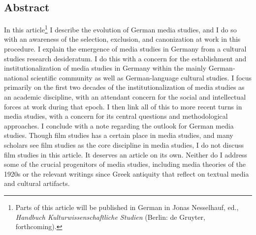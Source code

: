 \documentclass{tufte-handout}
\begin{document}
\begin{titlepage}
\vspace*{1em}


\hypertarget{abstract}{%
\section{\texorpdfstring{Abstract }{Abstract }}\label{abstract}}

In this article\footnote{Parts of this article will be published in
  German in Jonas Nesselhauf, ed., \emph{Handbuch
  Kulturwissenschaftliche Studien} (Berlin: de Gruyter, forthcoming).} I
describe the evolution of German media studies, and I do so with an
awareness of the selection, exclusion, and canonization at work in this
procedure. I explain the emergence of media studies in Germany from a
cultural studies research desideratum. I do this with a concern for the
establishment and institutionalization of media studies in Germany
within the mainly German-national scientific community as well as
German-language cultural studies. I focus primarily on the first two
decades of the institutionalization of media studies as an academic
discipline, with an attendant concern for the social and intellectual
forces at work during that epoch. I then link all of this to more recent
turns in media studies, with a concern for its central questions and
methodological approaches. I conclude with a note regarding the outlook
for German media studies. Though film studies has a certain place in
media studies, and many scholars see film studies as the core discipline
in media studies, I do not discuss film studies in this article. It
deserves an article on its own. Neither do I address some of the crucial
progenitors of media studies, including media theories of the 1920s or
the relevant writings since Greek antiquity that reflect on textual
media and cultural artifacts.

\enlargethispage{2\baselineskip}

\vspace*{2em}



 \end{titlepage}

\end{document}
